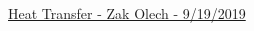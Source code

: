 \documentclass[10pt,landscape]{article}
\newenvironment{Figure}
     {\par\medskip\noindent\minipage{\linewidth}}
     {\endminipage\par\medskip}
\begin{document}
\raggedright
\footnotesize

\begin{center}
     \Large{\underline{Heat Transfer - Zak Olech - 9/19/2019}}
\end{center}
\begin{multicols}{3}

\setlength{\columnseprule}{0.25pt}
\setlength{\premulticols}{1pt}
\setlength{\postmulticols}{1pt}
\setlength{\multicolsep}{1pt}
\setlength{\columnsep}{2pt}

\end{multicols}
\end{document}
